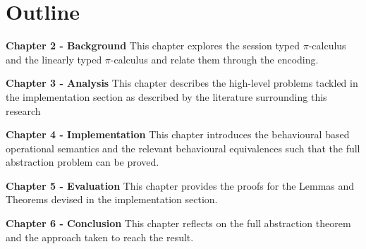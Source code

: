 \section{Outline}

\textbf{Chapter 2 - Background} This chapter explores the session typed $\pi$-calculus and the linearly typed $\pi$-calculus and relate them through the encoding.

\textbf{Chapter 3 - Analysis} This chapter describes the high-level problems tackled in the implementation section as described by the literature surrounding this research

\textbf{Chapter 4 - Implementation} This chapter introduces the behavioural based operational semantics and the relevant behavioural equivalences such that the full abstraction problem can be proved.

\textbf{Chapter 5 - Evaluation} This chapter provides the proofs for the Lemmas and Theorems devised in the implementation section.

\textbf{Chapter 6 - Conclusion} This chapter reflects on the full abstraction theorem and the approach taken to reach the result.


